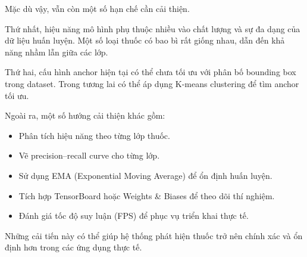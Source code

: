 \documentclass[12pt,a4paper]{article}
\begin{document}
Mặc dù vậy, vẫn còn một số hạn chế cần cải thiện.

Thứ nhất, hiệu năng mô hình phụ thuộc nhiều vào chất lượng và sự đa dạng của dữ liệu huấn luyện. Một số loại thuốc có bao bì rất giống nhau, dẫn đến khả năng nhầm lẫn giữa các lớp.

Thứ hai, cấu hình anchor hiện tại có thể chưa tối ưu với phân bố bounding box trong dataset. Trong tương lai có thể áp dụng K-means clustering để tìm anchor tối ưu.

Ngoài ra, một số hướng cải thiện khác gồm:
\begin{itemize}
    \item Phân tích hiệu năng theo từng lớp thuốc.
    \item Vẽ precision--recall curve cho từng lớp.
    \item Sử dụng EMA (Exponential Moving Average) để ổn định huấn luyện.
    \item Tích hợp TensorBoard hoặc Weights \& Biases để theo dõi thí nghiệm.
    \item Đánh giá tốc độ suy luận (FPS) để phục vụ triển khai thực tế.
\end{itemize}

Những cải tiến này có thể giúp hệ thống phát hiện thuốc trở nên chính xác và ổn định hơn trong các ứng dụng thực tế.
\end{document}
